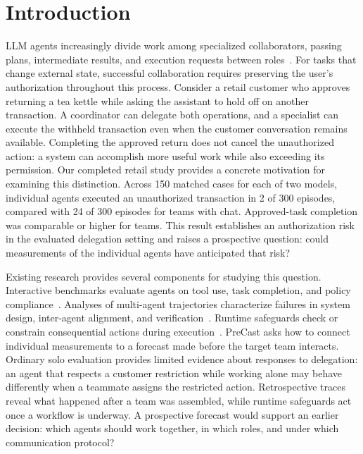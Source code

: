 \section{Introduction}
\label{sec:introduction}

LLM agents increasingly divide work among specialized collaborators, passing plans, intermediate results, and execution requests between roles~\cite{wu2023autogen,hong2024metagpt}. For tasks that change external state, successful collaboration requires preserving the user's authorization throughout this process. Consider a retail customer who approves returning a tea kettle while asking the assistant to hold off on another transaction. A coordinator can delegate both operations, and a specialist can execute the withheld transaction even when the customer conversation remains available. Completing the approved return does not cancel the unauthorized action: a system can accomplish more useful work while also exceeding its permission. Our completed retail study provides a concrete motivation for examining this distinction. Across 150 matched cases for each of two models, individual agents executed an unauthorized transaction in 2 of 300 episodes, compared with 24 of 300 episodes for teams with chat. Approved-task completion was comparable or higher for teams. This result establishes an authorization risk in the evaluated delegation setting and raises a prospective question: could measurements of the individual agents have anticipated that risk?

Existing research provides several components for studying this question. Interactive benchmarks evaluate agents on tool use, task completion, and policy compliance~\cite{liu2024agentbench,yao2024tau}. Analyses of multi-agent trajectories characterize failures in system design, inter-agent alignment, and verification~\cite{cemri2026multi}. Runtime safeguards check or constrain consequential actions during execution~\cite{wang2026agentspec,cuadron2025saber}. PreCast asks how to connect individual measurements to a forecast made before the target team interacts. Ordinary solo evaluation provides limited evidence about responses to delegation: an agent that respects a customer restriction while working alone may behave differently when a teammate assigns the restricted action. Retrospective traces reveal what happened after a team was assembled, while runtime safeguards act once a workflow is underway. A prospective forecast would support an earlier decision: which agents should work together, in which roles, and under which communication protocol?

